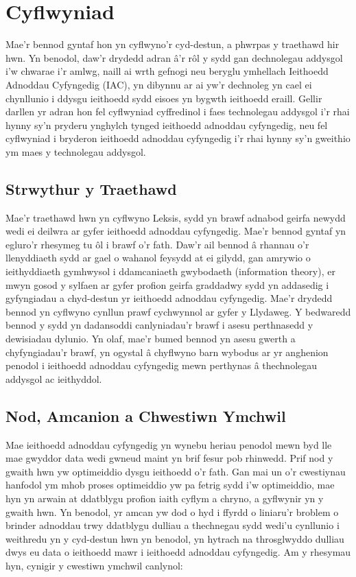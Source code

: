 \chapter{Cyflwyniad}    
Mae'r bennod gyntaf hon yn cyflwyno'r cyd-destun, a phwrpas y traethawd hir hwn. Yn benodol, daw'r drydedd adran â'r rôl y sydd gan dechnolegau addysgol i'w chwarae i'r amlwg, naill ai wrth gefnogi neu beryglu ymhellach Ieithoedd Adnoddau Cyfyngedig (IAC), yn dibynnu ar ai yw'r dechnoleg yn cael ei chynllunio i ddysgu ieithoedd sydd eisoes yn bygwth ieithoedd eraill. Gellir darllen yr adran hon fel cyflwyniad cyffredinol i faes technolegau addysgol i'r rhai hynny sy'n pryderu ynghylch tynged ieithoedd adnoddau cyfyngedig, neu fel cyflwyniad i bryderon ieithoedd adnoddau cyfyngedig i'r rhai hynny sy'n gweithio ym maes y technolegau addysgol.

\section{Strwythur y Traethawd}
Mae'r traethawd hwn yn cyflwyno Leksis, sydd yn brawf adnabod geirfa newydd wedi ei deilwra ar gyfer ieithoedd adnoddau cyfyngedig. Mae'r bennod gyntaf yn egluro'r rhesymeg tu ôl i brawf o'r fath. Daw'r ail bennod â rhannau o'r llenyddiaeth sydd ar gael o wahanol feysydd at ei gilydd, gan amrywio o ieithyddiaeth gymhwysol i ddamcaniaeth gwybodaeth (information theory), er mwyn gosod y sylfaen ar gyfer profion geirfa graddadwy sydd yn addasedig i gyfyngiadau a chyd-destun yr ieithoedd adnoddau cyfyngedig. Mae'r drydedd bennod yn cyflwyno cynllun prawf cychwynnol ar gyfer y Llydaweg. Y bedwaredd bennod y sydd yn dadansoddi canlyniadau'r brawf i asesu perthnasedd y dewisiadau dylunio. Yn olaf, mae'r bumed bennod yn asesu gwerth a chyfyngiadau'r brawf, yn ogystal â chyflwyno barn wybodus ar yr anghenion penodol i ieithoedd adnoddau cyfyngedig mewn perthynas â thechnolegau addysgol ac ieithyddol.

\section{Nod, Amcanion a Chwestiwn Ymchwil}
Mae ieithoedd adnoddau cyfyngedig yn wynebu heriau penodol mewn byd lle mae gwyddor data wedi gwneud maint yn brif fesur pob rhinwedd. Prif nod y gwaith hwn yw optimeiddio dysgu ieithoedd o’r fath. Gan mai un o’r cwestiynau hanfodol ym mhob proses optimeiddio yw pa fetrig sydd i’w optimeiddio, mae hyn yn arwain at ddatblygu profion iaith cyflym a chryno, a gyflwynir yn y gwaith hwn. Yn benodol, yr amcan yw dod o hyd i ffyrdd o liniaru’r broblem o brinder adnoddau trwy ddatblygu dulliau a thechnegau sydd wedi’u cynllunio i weithredu yn y cyd-destun hwn yn benodol, yn hytrach na throsglwyddo dulliau dwys eu data o ieithoedd mawr i ieithoedd adnoddau cyfyngedig. Am y rhesymau hyn, cynigir y cwestiwn ymchwil canlynol:

